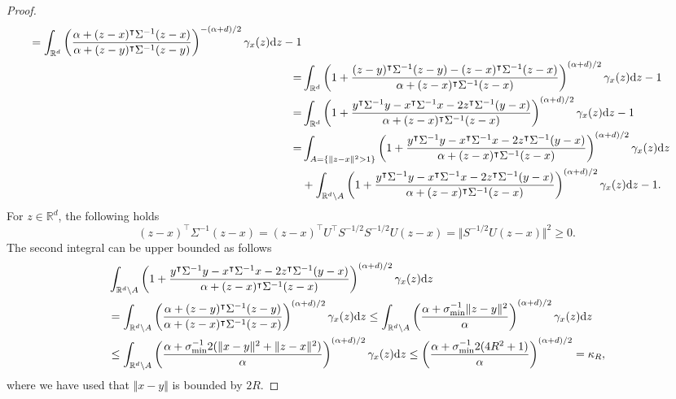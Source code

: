 \begin{proof}
\begin{align*}
    =\int_{\mathbb{R}^d} \left(\frac{\alpha + (z-x)^{\intercal}\Sigma^{-1}(z-x)}{\alpha + (z-y)^{\intercal}\Sigma^{-1}(z-y)}\right)^{-(\alpha+ d)/2} \gamma_{x}(z)\mathrm{d} z -1 \\
    =& \int_{\mathbb{R}^d}\left(1+\frac{(z-y)^{\intercal}\Sigma^{-1}(z-y)-(z-x)^{\intercal}\Sigma^{-1}(z-x)}{\alpha + (z-x)^{\intercal}\Sigma^{-1}(z-x)}\right)^{(\alpha+d)/2}\gamma_x(z)\mathrm{d} z -1\\
     =& \int_{\mathbb{R}^d}\left(1+\frac{y^{\intercal}\Sigma^{-1}y-x^{\intercal}\Sigma^{-1}x-2z^{\intercal}\Sigma^{-1}(y-x)}{\alpha + (z-x)^{\intercal}\Sigma^{-1}(z-x)}\right)^{(\alpha+d)/2}\gamma_x(z)\mathrm{d} z -1\\
     =&  \int_{A=\{\Vert z-x\Vert^2 > 1\}}\left(1+\frac{y^{\intercal}\Sigma^{-1}y-x^{\intercal}\Sigma^{-1}x-2z^{\intercal}\Sigma^{-1}(y-x)}{\alpha + (z-x)^{\intercal}\Sigma^{-1}(z-x)}\right)^{(\alpha+d)/2}\gamma_x(z)\mathrm{d} z\\
    &+  \int_{\mathbb{R}^d\setminus A}\left(1+\frac{y^{\intercal}\Sigma^{-1}y-x^{\intercal}\Sigma^{-1}x-2z^{\intercal}\Sigma^{-1}(y-x)}{\alpha + (z-x)^{\intercal}\Sigma^{-1}(z-x)}\right)^{(\alpha+d)/2}\gamma_x(z)\mathrm{d} z-1.
\end{align*}
For $z\in \mathbb{R}^d$, the following holds 
\begin{equation*}
    (z-x)^{\intercal}\Sigma^{-1}(z-x) = (z-x)^{\intercal}U^{\intercal}S^{-1/2}S^{-1/2}U(z-x) = \Vert S^{-1/2}U(z-x)\Vert^2 \geq 0.
\end{equation*}
The second integral can be upper bounded as follows
\begin{align*}
    &\int_{\mathbb{R}^d\setminus A}\left(1+\frac{y^{\intercal}\Sigma^{-1}y-x^{\intercal}\Sigma^{-1}x-2z^{\intercal}\Sigma^{-1}(y-x)}{\alpha + (z-x)^{\intercal}\Sigma^{-1}(z-x)}\right)^{(\alpha+d)/2}\gamma_x(z)\mathrm{d} z \\
    & = \int_{\mathbb{R}^d\setminus A}\left(\frac{\alpha + (z-y)^{\intercal}\Sigma^{-1}(z-y)}{\alpha + (z-x)^{\intercal}\Sigma^{-1}(z-x)}\right)^{(\alpha+ d)/2} \gamma_{x}(z)\mathrm{d} z \leq \int_{\mathbb{R}^d\setminus A}\left(\frac{\alpha + \sigma_{\min}^{-1}\Vert z-y\Vert^2}{\alpha}\right)^{(\alpha+ d)/2} \gamma_{x}(z)\mathrm{d} z \\
    &\leq\int_{\mathbb{R}^d\setminus A} \left(\frac{\alpha + \sigma_{\min}^{-1}2(\Vert x-y\Vert^2 + \Vert z-x\Vert^2)}{\alpha}\right)^{(\alpha+ d)/2}  \gamma_{x}(z)\mathrm{d} z \leq \left(\frac{\alpha + \sigma_{\min}^{-1}2(4R^2 + 1)}{\alpha}\right)^{(\alpha+ d)/2} = \kappa_R,
\end{align*}
where we have used that $\Vert x-y\Vert$ is bounded by $2R$.

\end{proof}
